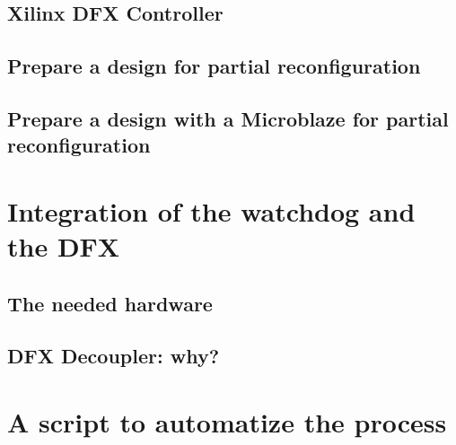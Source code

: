 \subsection{Xilinx DFX Controller}
\subsection{Prepare a design for partial reconfiguration}
\subsection{Prepare a design with a Microblaze for partial reconfiguration}

\section{Integration of the watchdog and the DFX}
\subsection{The needed hardware}
\subsection{DFX Decoupler: why?}

\section{A script to automatize the process}